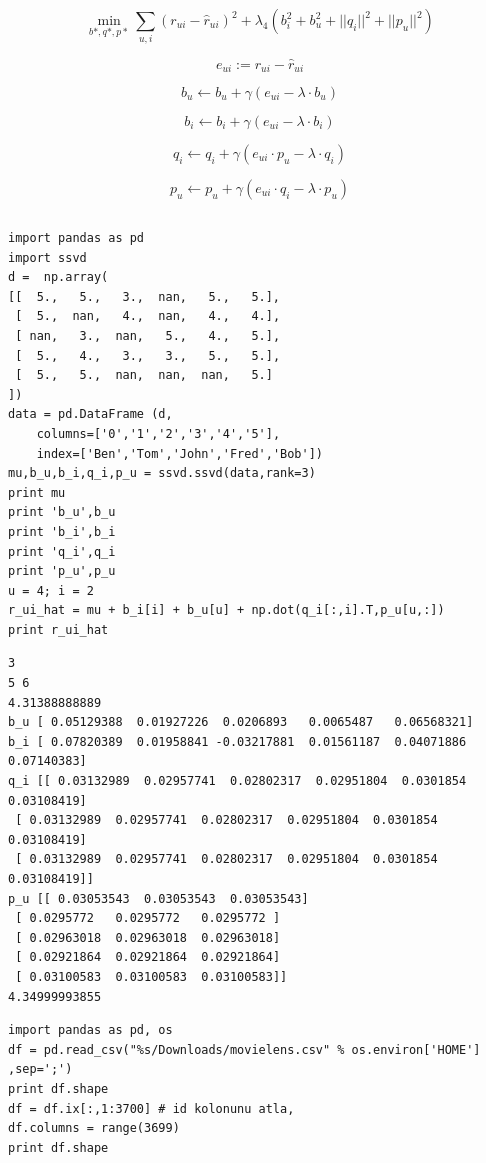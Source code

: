 \documentclass[12pt,fleqn]{article}\usepackage{../common}
\begin{document}
$$
\min_{b*,q*,p*} \sum_{u,i} (r_{ui} - \hat{r}_{ui})^2 + 
\lambda_4 (b_i^2 + b_u^2 + ||q_i||^2 + ||p_u||^2)
$$

$$ e_{ui} := r_{ui} - \hat{r}_{ui} $$

$$
b_u \leftarrow b_u + \gamma (e_{ui} - \lambda \cdot b_u)
$$

$$
b_i \leftarrow b_i + \gamma (e_{ui} - \lambda \cdot b_i)
$$

$$
q_i \leftarrow q_i + \gamma (e_{ui}\cdot p_u - \lambda \cdot q_i)
$$

$$
p_u \leftarrow p_u + \gamma (e_{ui}\cdot q_i - \lambda \cdot p_u)
$$


\inputminted[fontsize=\footnotesize]{python}{ssvd.py}

\begin{verbatim}
import pandas as pd
import ssvd
d =  np.array(
[[  5.,   5.,   3.,  nan,   5.,   5.],
 [  5.,  nan,   4.,  nan,   4.,   4.],
 [ nan,   3.,  nan,   5.,   4.,   5.],
 [  5.,   4.,   3.,   3.,   5.,   5.],
 [  5.,   5.,  nan,  nan,  nan,   5.]
])
data = pd.DataFrame (d,
    columns=['0','1','2','3','4','5'],
    index=['Ben','Tom','John','Fred','Bob'])
mu,b_u,b_i,q_i,p_u = ssvd.ssvd(data,rank=3)
print mu
print 'b_u',b_u
print 'b_i',b_i
print 'q_i',q_i
print 'p_u',p_u
u = 4; i = 2
r_ui_hat = mu + b_i[i] + b_u[u] + np.dot(q_i[:,i].T,p_u[u,:])
print r_ui_hat
\end{verbatim}

\begin{verbatim}
3
5 6
4.31388888889
b_u [ 0.05129388  0.01927226  0.0206893   0.0065487   0.06568321]
b_i [ 0.07820389  0.01958841 -0.03217881  0.01561187  0.04071886  0.07140383]
q_i [[ 0.03132989  0.02957741  0.02802317  0.02951804  0.0301854   0.03108419]
 [ 0.03132989  0.02957741  0.02802317  0.02951804  0.0301854   0.03108419]
 [ 0.03132989  0.02957741  0.02802317  0.02951804  0.0301854   0.03108419]]
p_u [[ 0.03053543  0.03053543  0.03053543]
 [ 0.0295772   0.0295772   0.0295772 ]
 [ 0.02963018  0.02963018  0.02963018]
 [ 0.02921864  0.02921864  0.02921864]
 [ 0.03100583  0.03100583  0.03100583]]
4.34999993855
\end{verbatim}


\begin{verbatim}
import pandas as pd, os
df = pd.read_csv("%s/Downloads/movielens.csv" % os.environ['HOME'] ,sep=';')
print df.shape
df = df.ix[:,1:3700] # id kolonunu atla,
df.columns = range(3699)
print df.shape
\end{verbatim}
\end{document}
